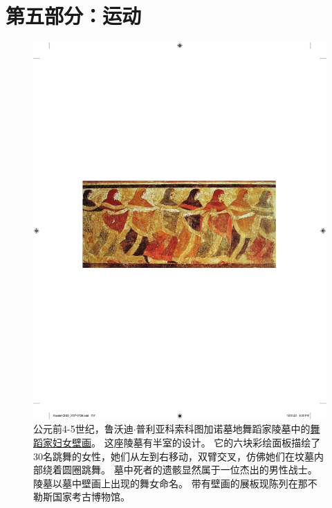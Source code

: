\chapter*{第五部分：运动}

\begin{figure}[htbp]
	\centering
	\includegraphics[width=1.0\linewidth]{chap30/fig_30_0}
	\caption{公元前4-5世纪，鲁沃迪$\cdot$普利亚科索科图加诺墓地舞蹈家陵墓中的\href{https://en.wikipedia.org/wiki/Tomb_of_the_Dancers}{舞蹈家妇女壁画}。
		这座陵墓有半室的设计。
		它的六块彩绘面板描绘了30名跳舞的女性，她们从左到右移动，双臂交叉，仿佛她们在坟墓内部绕着圆圈跳舞。
		墓中死者的遗骸显然属于一位杰出的男性战士。
		陵墓以墓中壁画上出现的舞女命名。
		带有壁画的展板现陈列在那不勒斯国家考古博物馆。 }
	\label{fig:30_0}
\end{figure}


